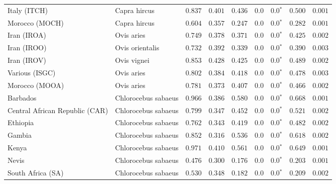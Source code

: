 \begin{center}
\begin{adjustbox}{width = 1\textwidth}
\begin{tabular}{|l|l|r|r|r|r|r|r|r|}
            Italy (ITCH)                    & Capra hircus          & $ 0.837$ & $ 0.401$ & $ 0.436$ & $0.0$    & $\bm{0.0{^*}}$ & $ 0.500$ & $ 0.001$  \\
            Morocco (MOCH)                    & Capra hircus     & $ 0.604$ & $ 0.357$ & $ 0.247$ & $0.0$    & $\bm{0.0{^*}}$ & $ 0.282$ & $ 0.001$ \\
            Iran (IROA)                    & Ovis aries         & $ 0.749$ & $ 0.378$ & $ 0.371$ & $0.0$    & $\bm{0.0{^*}}$ & $ 0.425$ & $ 0.002$ \\
            Iran (IROO)                 & Ovis orientalis          & $ 0.732$ & $ 0.392$ & $ 0.339$ & $0.0$    & $\bm{0.0{^*}}$ & $ 0.390$ & $ 0.003$ \\
            Iran (IROV)                 & Ovis vignei          & $ 0.853$ & $ 0.428$ & $ 0.425$ & $0.0$    & $\bm{0.0{^*}}$ & $ 0.489$ & $ 0.002$ \\
            Various (ISGC)                       & Ovis aries & $ 0.802$ & $ 0.384$ & $ 0.418$ & $0.0$    & $\bm{0.0{^*}}$ & $ 0.478$ & $ 0.003$ \\
            Morocco (MOOA) & Ovis aries & $ 0.781$ & $ 0.373$ & $ 0.407$ & $0.0$ & $\bm{0.0{^*}}$ & $ 0.466$ & $ 0.002$ \\
            Barbados                       & Chlorocebus sabaeus & $ 0.966$ & $ 0.386$ & $ 0.580$ & $0.0$    & $\bm{0.0{^*}}$ & $ 0.668$ & $ 0.001$ \\
            Central African Republic (CAR)                         & Chlorocebus sabaeus & $ 0.799$ & $ 0.347$ & $ 0.452$ & $0.0$    & $\bm{0.0{^*}}$ & $ 0.521$ & $ 0.002$ \\
            Ethiopia                          & Chlorocebus sabaeus & $ 0.762$ & $ 0.343$ & $ 0.419$ & $0.0$    & $\bm{0.0{^*}}$ & $ 0.482$ & $ 0.002$ \\
            Gambia                          & Chlorocebus sabaeus & $ 0.852$ & $ 0.316$ & $ 0.536$ & $0.0$    & $\bm{0.0{^*}}$ & $ 0.618$ & $ 0.002$ \\
            Kenya              & Chlorocebus sabaeus & $ 0.971$ & $ 0.410$ & $ 0.561$ & $0.0$    & $\bm{0.0{^*}}$ & $ 0.649$ & $ 0.001$ \\
            Nevis               & Chlorocebus sabaeus & $ 0.476$ & $ 0.300$ & $ 0.176$ & $0.0$    & $\bm{0.0{^*}}$ & $ 0.203$ & $ 0.001$ \\
            South Africa (SA)                         & Chlorocebus sabaeus & $ 0.530$ & $ 0.348$ & $ 0.182$ & $0.0$    & $\bm{0.0{^*}}$ & $ 0.209$ & $ 0.002$ \\

\end{tabular}
\end{adjustbox}
\end{center}

